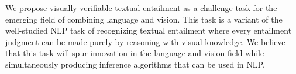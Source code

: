 We propose visually-verifiable textual entailment as a challenge task for the emerging field of combining language and vision. This task is a variant of the well-studied NLP task of recognizing textual entailment where every entailment judgment can be made purely by reasoning with visual knowledge. We believe that this task will spur innovation in the language and vision field while simultaneously producing inference algorithms that can be used in NLP.
